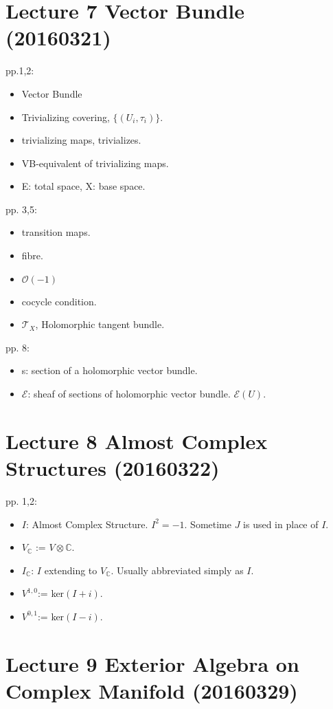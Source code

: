 \documentclass{book}
\numberwithin{equation}{subsection} %
\theoremstyle{definition}
\begin{document}
\section{Lecture 7 Vector Bundle (20160321)}
pp.1,2:
\begin{itemize}
    \item Vector Bundle
    \item Trivializing covering, $\{(U_i,\tau_i)\}$.
    \item trivializing maps, trivializes.
    \item VB-equivalent of trivializing maps.
    \item E: total space, X: base space.
\end{itemize}
pp. 3,5:
\begin{itemize}
    \item transition maps.
    \item fibre.
    \item $\mathcal{O}(-1)$
    \item cocycle condition.
    \item $\mathcal{T}_X$, Holomorphic tangent bundle.
\end{itemize}
pp. 8:
\begin{itemize}
    \item s: section of a holomorphic vector bundle.
    \item $\mathcal{E}$: sheaf of sections of holomorphic vector bundle. $\mathcal{E}(U)$.
\end{itemize}
	
\section{Lecture 8 Almost Complex Structures (20160322)}
pp. 1,2:
\begin{itemize}
    \item $I$: Almost Complex Structure. $I^2=-1$. Sometime $J$ is used in place of $I$.
    \item $V_{\mathbb{C}}$ := $V\otimes \mathbb{C}$.
    \item $I_\mathbb{C}$: $I$ extending to $V_{\mathbb{C}}$. Usually abbreviated simply as $I$.
    \item $V^{1,0}$:= ker$(I+i)$.
    \item $V^{0,1}$:= ker$(I-i)$.
\end{itemize}
	
\section{Lecture 9 Exterior Algebra on Complex Manifold (20160329)}
\end{document}

